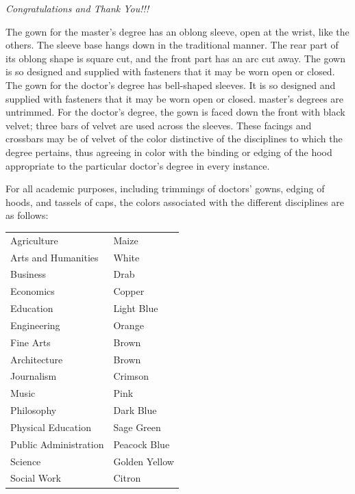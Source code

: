 \documentclass{tufte-handout}
\begin{document}
\begin{fullwidth}
\Huge{\textit{Congratulations and Thank You!!!}}
\end{fullwidth}


The gown for the master's degree has an oblong sleeve, open at the wrist, like the others. The sleeve base hangs down in the traditional manner. The rear part of its oblong shape is square cut, and the front part has an arc cut away. The gown is so designed and supplied with fasteners that it may be worn open or closed. The gown for the doctor's degree has bell-shaped sleeves. It is so designed and supplied with fasteners that it may be worn open or closed.
master's degrees are untrimmed. For the doctor's degree, the gown is faced down the front with black velvet; three bars of velvet are used across the sleeves. These facings and crossbars may be of velvet of the color distinctive of the disciplines to which the degree pertains, thus agreeing in color with the binding or edging of the hood appropriate to the particular doctor's degree in every instance.

For all academic purposes, including trimmings of doctors' gowns, edging of hoods, and tassels of caps, the colors associated with the different disciplines are as follows: 

\begin{margintable}
\begin{tabular}{ll}
Agriculture                     & Maize         \\
Arts and Humanities             & White         \\
Business                           & Drab          \\
Economics                       & Copper        \\
Education                       & Light Blue    \\
Engineering                     & Orange        \\
Fine Arts                       & Brown         \\
Architecture                    & Brown         \\
Journalism                      & Crimson       \\
Music                           & Pink          \\
Philosophy                      & Dark Blue     \\
Physical Education              & Sage Green    \\
Public Administration           & Peacock Blue  \\
Science                         & Golden Yellow \\
Social Work                     & Citron       
\end{tabular}
\end{margintable}
\end{document}
